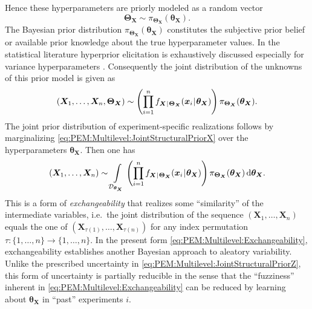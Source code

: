 Hence these hyperparameters are priorly modeled as a random vector
\begin{equation} \label{eq:PEM:Multilevel:ParametricPriorThetaX}
  \bm{\Theta}_{\bm{X}} \sim \pi_{\bm{\Theta}_{\bm{X}}} (\bm{\theta}_{\bm{X}}).
\end{equation}
The Bayesian prior distribution \(\pi_{\bm{\Theta}_{\bm{X}}} (\bm{\theta}_{\bm{X}})\) constitutes the subjective prior belief or available prior knowledge about the true hyperparameter values.
In the statistical literature hyperprior elicitation is exhaustively discussed especially for variance hyperparameters \cite{Multilevel:Berger1996,Multilevel:Berger2005,Multilevel:Gelman2006:b}.
Consequently the joint distribution of the unknowns of this prior model is given as
\begin{equation} \label{eq:PEM:Multilevel:JointStructuralPriorX}
  (\bm{X}_1,\ldots,\bm{X}_n,\bm{\Theta}_{\bm{X}}) \sim \left( \prod_{i=1}^n f_{\bm{X} {\:\!}|{\:\!} \bm{\Theta}_{\bm{X}}} (\bm{x}_i {\:\!}|{\:\!} \bm{\theta}_{\bm{X}}) \right) \pi_{\bm{\Theta}_{\bm{X}}} (\bm{\theta}_{\bm{X}}).
\end{equation}
The joint prior distribution of experiment-specific realizations follows by marginalizing \cref{eq:PEM:Multilevel:JointStructuralPriorX} over the hyperparameters \(\bm{\theta}_{\bm{X}}\).
Then one has
\begin{equation} \label{eq:PEM:Multilevel:Exchangeability}
  (\bm{X}_1,\ldots,\bm{X}_n) \sim \int\limits_{\mathcal{D}_{\bm{\theta}_{\bm{X}}}} \left( \prod\limits_{i=1}^n f_{\bm{X} {\:\!}|{\:\!} \bm{\Theta}_{\bm{X}}} (\bm{x}_i {\:\!}|{\:\!} \bm{\theta}_{\bm{X}}) \right)
  \pi_{\bm{\Theta}_{\bm{X}}} (\bm{\theta}_{\bm{X}}) \, \mathrm{d} \bm{\theta}_{\bm{X}}.
\end{equation}
This is a form of \textit{exchangeability} \cite{Multilevel:Draper1993,Multilevel:Bernardo1996} that realizes some ``similarity'' of the intermediate variables,
i.e.\ the joint distribution of the sequence \((\bm{X}_1,\ldots,\bm{X}_n)\) equals the one of \((\bm{X}_{\tau(1)},\ldots,\bm{X}_{\tau(n)})\) for any index permutation \(\tau \colon \{1,\ldots,n\} \rightarrow \{1,\ldots,n\}\).
In the present form \cref{eq:PEM:Multilevel:Exchangeability}, exchangeability establishes another Bayesian approach to aleatory variability.
Unlike the prescribed uncertainty in \cref{eq:PEM:Multilevel:JointStructuralPriorZ},  
this form of uncertainty is partially reducible in the sense that the ``fuzziness'' inherent in \cref{eq:PEM:Multilevel:Exchangeability} can be reduced by learning about \(\bm{\theta}_{\bm{X}}\) in ``past'' experiments \(i\).
